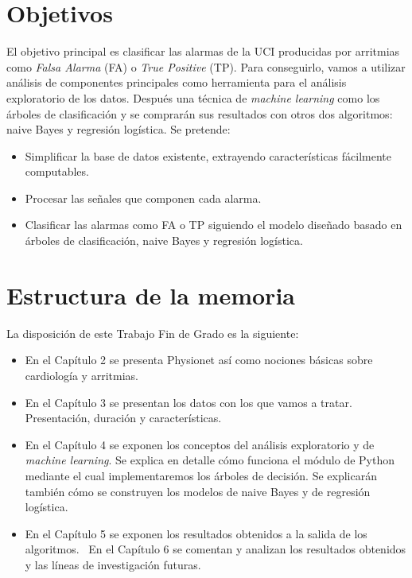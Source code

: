 \section{Objetivos}

	El objetivo principal es clasificar las alarmas de la UCI producidas por arritmias como \textit{Falsa Alarma} (FA) o \textit{True Positive} (TP).
\vspace*{0.5cm}
	Para conseguirlo, vamos a utilizar análisis de componentes principales como herramienta para el análisis exploratorio de los datos. Después una técnica de \textit{machine learning} como los árboles de clasificación y se comprarán sus resultados con otros dos algoritmos: naive Bayes y regresión logística. Se pretende:
	
\begin{itemize}
	\item Simplificar la base de datos existente, extrayendo características fácilmente computables.
	\item Procesar las señales que componen cada alarma. 
	\item Clasificar las alarmas como FA o TP siguiendo el modelo diseñado basado en árboles de clasificación, naive Bayes y regresión logística.
\end{itemize}

\section{Estructura de la memoria}
	La disposición de este Trabajo Fin de Grado es la siguiente:
\begin{itemize}
	\item En el Capítulo 2 se presenta Physionet así como nociones básicas sobre cardiología y arritmias.
	\item En el Capítulo 3 se presentan los datos con los que vamos a tratar. Presentación, duración y características.
	\item En el Capítulo 4 se exponen los conceptos del análisis exploratorio y de \textit{machine learning}. Se explica en detalle cómo funciona el módulo de Python mediante el cual implementaremos los árboles de decisión. Se explicarán también cómo se construyen los modelos de naive Bayes y de regresión logística.
	\item En el Capítulo 5 se exponen los resultados obtenidos a la salida de los algoritmos.
	\ En el Capítulo 6 se comentan y analizan los resultados obtenidos y las líneas de investigación futuras.
\end{itemize}	
